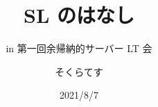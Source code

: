 \title[SL のはなし]{SL のはなし}
\subtitle[第一回余帰納的サーバー LT 会]{in 第一回余帰納的サーバー LT 会}
\author{そくらてす}
\date{2021/8/7}
